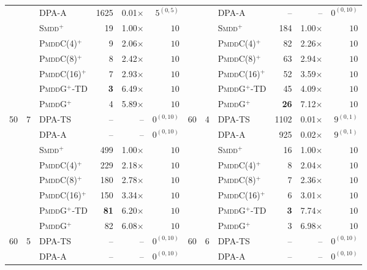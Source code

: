\documentclass[letterpaper]{article}
\begin{document}
\begin{table}[t]
{\begin{tabular}{rrlrrrrrlrrr}
 &  & DPA-A & 1625 & 0.01$\times$ & $5^{(0, 5)}$ &  &  & DPA-A & -- & -- & $0^{(0, 10)}$ \\
 &  & \textsc{Smdd}$^+$ & 19 & 1.00$\times$ & $10$ &  &  & \textsc{Smdd}$^+$ & 184 & 1.00$\times$ & $10$ \\
 &  & \textsc{PmddC}(4)$^+$ & 9 & 2.06$\times$ & $10$ &  &  & \textsc{PmddC}(4)$^+$ & 82 & 2.26$\times$ & $10$ \\
 &  & \textsc{PmddC}(8)$^+$ & 8 & 2.42$\times$ & $10$ &  &  & \textsc{PmddC}(8)$^+$ & 63 & 2.94$\times$ & $10$ \\
 &  & \textsc{PmddC}(16)$^+$ & 7 & 2.93$\times$ & $10$ &  &  & \textsc{PmddC}(16)$^+$ & 52 & 3.59$\times$ & $10$ \\
 &  & \textsc{PmddG$^+$-TD} & \textbf{3} & 6.49$\times$ & $10$ &  &  & \textsc{PmddG$^+$-TD} & 45 & 4.09$\times$ & $10$ \\
 &  & \textsc{PmddG}$^+$ & 4 & 5.89$\times$ & $10$ &  &  & \textsc{PmddG}$^+$ & \textbf{26} & 7.12$\times$ & $10$ \\
\midrule
\multirow{8}{*}{50} & \multirow{8}{*}{7} & DPA-TS & -- & -- & $0^{(0, 10)}$ & \multirow{8}{*}{60} & \multirow{8}{*}{4} & DPA-TS & 1102 & 0.01$\times$ & $9^{(0, 1)}$ \\
 &  & DPA-A & -- & -- & $0^{(0, 10)}$ &  &  & DPA-A & 925 & 0.02$\times$ & $9^{(0, 1)}$ \\
 &  & \textsc{Smdd}$^+$ & 499 & 1.00$\times$ & $10$ &  &  & \textsc{Smdd}$^+$ & 16 & 1.00$\times$ & $10$ \\
 &  & \textsc{PmddC}(4)$^+$ & 229 & 2.18$\times$ & $10$ &  &  & \textsc{PmddC}(4)$^+$ & 8 & 2.04$\times$ & $10$ \\
 &  & \textsc{PmddC}(8)$^+$ & 180 & 2.78$\times$ & $10$ &  &  & \textsc{PmddC}(8)$^+$ & 7 & 2.36$\times$ & $10$ \\
 &  & \textsc{PmddC}(16)$^+$ & 150 & 3.34$\times$ & $10$ &  &  & \textsc{PmddC}(16)$^+$ & 6 & 3.01$\times$ & $10$ \\
 &  & \textsc{PmddG$^+$-TD} & \textbf{81} & 6.20$\times$ & $10$ &  &  & \textsc{PmddG$^+$-TD} & \textbf{3} & 7.74$\times$ & $10$ \\
 &  & \textsc{PmddG}$^+$ & 82 & 6.08$\times$ & $10$ &  &  & \textsc{PmddG}$^+$ & 3 & 6.98$\times$ & $10$ \\
\midrule
\multirow{8}{*}{60} & \multirow{8}{*}{5} & DPA-TS & -- & -- & $0^{(0, 10)}$ & \multirow{8}{*}{60} & \multirow{8}{*}{6} & DPA-TS & -- & -- & $0^{(0, 10)}$ \\
 &  & DPA-A & -- & -- & $0^{(0, 10)}$ &  &  & DPA-A & -- & -- & $0^{(0, 10)}$ \\

\end{tabular}}
\end{table}
\end{document}
